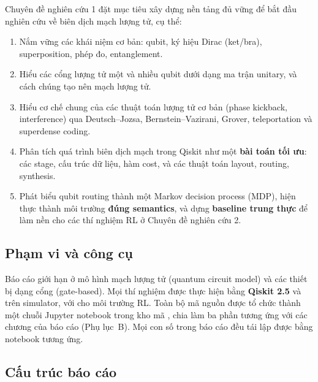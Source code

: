 Chuyên đề nghiên cứu 1 đặt mục tiêu xây dựng nền tảng đủ vững để bắt đầu nghiên cứu về biên dịch mạch
lượng tử, cụ thể:
\begin{enumerate}[noitemsep]
  \item Nắm vững các khái niệm cơ bản: qubit, ký hiệu Dirac (ket/bra), superposition, phép đo,
    entanglement.
  \item Hiểu các cổng lượng tử một và nhiều qubit dưới dạng ma trận unitary, và cách chúng tạo nên
    mạch lượng tử.
  \item Hiểu cơ chế chung của các thuật toán lượng tử cơ bản (phase kickback, interference) qua
    Deutsch--Jozsa, Bernstein--Vazirani, Grover, teleportation và superdense coding.
  \item Phân tích quá trình biên dịch mạch trong Qiskit như một \textbf{bài toán tối ưu}: các stage,
    cấu trúc dữ liệu, hàm cost, và các thuật toán layout, routing, synthesis.
  \item Phát biểu qubit routing thành một Markov decision process (MDP), hiện thực thành môi trường
     \textbf{đúng semantics}, và dựng \textbf{baseline trung thực} để làm nền cho
    các thí nghiệm RL ở Chuyên đề nghiên cứu 2.
\end{enumerate}

\subsection{Phạm vi và công cụ}

Báo cáo giới hạn ở mô hình mạch lượng tử (quantum circuit model) và các thiết bị dạng cổng
(gate-based). Mọi thí nghiệm được thực hiện bằng \textbf{Qiskit 2.5} \cite{qiskit2024} và
 trên simulator, với  cho môi trường RL. Toàn bộ mã nguồn được tổ
chức thành một chuỗi Jupyter notebook trong kho mã , chia làm ba phần tương
ứng với các chương của báo cáo (Phụ lục~B). Mọi con số trong báo cáo đều tái lập được
bằng notebook tương ứng.

\subsection{Cấu trúc báo cáo}

